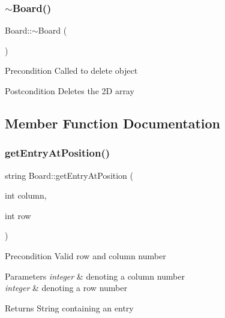 \subsubsection{\texorpdfstring{$\sim$\+Board()}{~Board()}}
{\footnotesize\ttfamily Board\+::$\sim$\+Board (\begin{DoxyParamCaption}{ }\end{DoxyParamCaption})}

\begin{DoxyPrecond}{Precondition}
Called to delete object 
\end{DoxyPrecond}
\begin{DoxyPostcond}{Postcondition}
Deletes the 2D array 
\end{DoxyPostcond}


\subsection{Member Function Documentation}
\mbox{\label{classBoard_aa1985711c8014a20b04e4b8e0413a93c}} 
\subsubsection{\texorpdfstring{get\+Entry\+At\+Position()}{getEntryAtPosition()}}
{\footnotesize\ttfamily string Board\+::get\+Entry\+At\+Position (\begin{DoxyParamCaption}\item[{int}]{column,  }\item[{int}]{row }\end{DoxyParamCaption})}

\begin{DoxyPrecond}{Precondition}
Valid row and column number 
\end{DoxyPrecond}

\begin{DoxyParams}{Parameters}
{\em integer} & denoting a column number \\
\hline
{\em integer} & denoting a row number \\
\hline
\end{DoxyParams}
\begin{DoxyReturn}{Returns}
String containing an entry 
\end{DoxyReturn}
\mbox{\label{classBoard_aca49f093314a104381d05998bbf62f7f}} 
